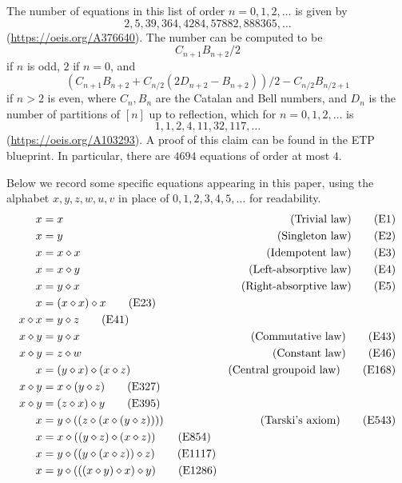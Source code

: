 The number of equations in this list of order $n=0,1,2,\dots$ is given by
$$ 2, 5, 39, 364, 4284, 57882, 888365, \dots$$
(\url{https://oeis.org/A376640}).  The number can be computed to be
$$ C_{n+1} B_{n+2}/2$$
if $n$ is odd, $2$ if $n=0$, and
$$ (C_{n+1} B_{n+2}+ C_{n/2}(2D_{n+2}-B_{n+2}))/2 - C_{n/2} B_{n/2+1}$$
if $n > 2$ is even, where $C_n, B_n$ are the Catalan and Bell numbers, and $D_n$ is the number of partitions of $[n]$ up to reflection, which for $n=0,1,2,\dots$ is
$$ 1, 1, 2, 4, 11, 32, 117, \dots$$
(\url{https://oeis.org/A103293}).  A proof of this claim can be found in the ETP blueprint.  In particular, there are $4694$ equations of order at most $4$.

Below we record some specific equations appearing in this paper, using the alphabet $x,y,z,w,u,v$ in place of $0,1,2,3,4,5,\dots$ for readability.
\begin{align}
        x &= x & \hbox{(Trivial law)} \label{eq1}\tag{E1} \\
        x &= y & \hbox{(Singleton law)} \label{eq2}\tag{E2} \\
        x &= x \op x & \hbox{(Idempotent law)} \label{eq3}\tag{E3} \\
        x &= x \op y & \hbox{(Left-absorptive law)} \label{eq4}\tag{E4} \\
        x &= y \op x & \hbox{(Right-absorptive law)} \label{eq5}\tag{E5} \\
        x &= (x \op x) \op x \label{eq23}\tag{E23} \\
        x \op x &= y \op z \label{eq41}\tag{E41} \\
        x \op y &= y \op x & \hbox{(Commutative law)} \label{eq43}\tag{E43} \\
        x \op y &= z \op w & \hbox{(Constant law)} \label{eq46}\tag{E46} \\
        x &= (y \op x) \op (x \op z) & \hbox{(Central groupoid law)} \label{eq168}\tag{E168} \\
        x \op y &= x \op (y \op z) \label{eq327}\tag{E327} \\
        x \op y &= (z \op x) \op y \label{eq395}\tag{E395} \\
        x &= y \op ( (z \op (x \op (y \op z)))) & \hbox{(Tarski's axiom)} \label{eq543}\tag{E543} \\
        x &= x \op ((y \op z) \op (x \op z)) \label{eq854}\tag{E854}\\
        x &= y \op ((y \op (x \op z)) \op z) \label{eq1117}\tag{E1117} \\
        x &= y \op (((x \op y) \op x) \op y) \label{eq1286}\tag{E1286} \\

\end{align}
